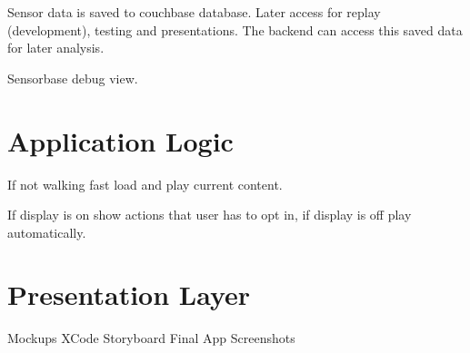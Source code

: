 Sensor data is saved to couchbase database.
Later access for replay (development), testing and presentations.
The backend can access this saved data for later analysis.

Sensorbase debug view.
\cite{GCD-Reference}

\section{Application Logic}

If not walking fast load and play current content.

If display is on show actions that user has to opt in, if display is off play automatically. 

\section{Presentation Layer}

Mockups
XCode Storyboard
Final App Screenshots